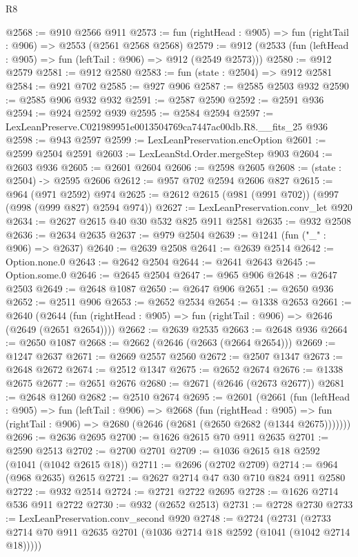 \begin{lexlean}{R8}
\begin{coremodule}
@2568 := @910 @2566 @911
@2573 := fun (rightHead : @905) => fun (rightTail : @906) => @2553 (@2561 @2568 @2568)
@2579 := @912 (@2533 (fun (leftHead : @905) => fun (leftTail : @906) => @912 (@2549 @2573)))
@2580 := @912 @2579
@2581 := @912 @2580
@2583 := fun (state : @2504) => @912 @2581
@2584 := @921 @702
@2585 := @927 @906
@2587 := @2585 @2503 @932
@2590 := @2585 @906 @932 @932
@2591 := @2587 @2590
@2592 := @2591 @936
@2594 := @924 @2592 @939
@2595 := @2584 @2594
@2597 := LexLeanPreserve.C021989951e0013504769ca7447ac00db.R8.__fits_25 @936
@2598 := @943 @2597
@2599 := LexLeanPreservation.encOption
@2601 := @2599 @2504 @2591
@2603 := LexLeanStd.Order.mergeStep @903
@2604 := @2603 @936
@2605 := @2601 @2604
@2606 := @2598 @2605
@2608 := (state : @2504) -> @2595 @2606
@2612 := @957 @702 @2594 @2606 @827
@2615 := @964 (@971 @2592) @974
@2625 := @2612 @2615 (@981 (@991 @702)) (@997 (@998 (@999 @827) @2594 @974))
@2627 := LexLeanPreservation.conv_let @920
@2634 := @2627 @2615 @40 @30 @532 @825 @911 @2581
@2635 := @932 @2508
@2636 := @2634 @2635
@2637 := @979 @2504
@2639 := @1241 (fun ("_" : @906) => @2637)
@2640 := @2639 @2508
@2641 := @2639 @2514
@2642 := Option.none.{0}
@2643 := @2642 @2504
@2644 := @2641 @2643
@2645 := Option.some.{0}
@2646 := @2645 @2504
@2647 := @965 @906
@2648 := @2647 @2503
@2649 := @2648 @1087
@2650 := @2647 @906
@2651 := @2650 @936
@2652 := @2511 @906
@2653 := @2652 @2534
@2654 := @1338 @2653
@2661 := @2640
    (@2644 (fun (rightHead : @905) => fun (rightTail : @906) => @2646 (@2649 (@2651 @2654))))
@2662 := @2639 @2535
@2663 := @2648 @936
@2664 := @2650 @1087
@2668 := @2662 (@2646 (@2663 (@2664 @2654)))
@2669 := @1247 @2637
@2671 := @2669 @2557 @2560
@2672 := @2507 @1347
@2673 := @2648 @2672
@2674 := @2512 @1347
@2675 := @2652 @2674
@2676 := @1338 @2675
@2677 := @2651 @2676
@2680 := @2671 (@2646 (@2673 @2677))
@2681 := @2648 @1260
@2682 := @2510 @2674
@2695 := @2601
    (@2661
      (fun (leftHead : @905) =>
      fun (leftTail : @906) =>
      @2668
        (fun (rightHead : @905) =>
        fun (rightTail : @906) => @2680 (@2646 (@2681 (@2650 @2682 (@1344 @2675)))))))
@2696 := @2636 @2695
@2700 := @1626 @2615 @70 @911 @2635
@2701 := @2590 @2513
@2702 := @2700 @2701
@2709 := @1036 @2615 @18 @2592 (@1041 (@1042 @2615 @18))
@2711 := @2696 (@2702 @2709)
@2714 := @964 (@968 @2635) @2615
@2721 := @2627 @2714 @47 @30 @710 @824 @911 @2580
@2722 := @932 @2514
@2724 := @2721 @2722 @2695
@2728 := @1626 @2714 @536 @911 @2722
@2730 := @932 (@2652 @2513)
@2731 := @2728 @2730
@2733 := LexLeanPreservation.conv_second @920
@2748 := @2724
    (@2731 (@2733 @2714 @70 @911 @2635 @2701 (@1036 @2714 @18 @2592 (@1041 (@1042 @2714 @18)))))

\end{coremodule}
\end{lexlean}
